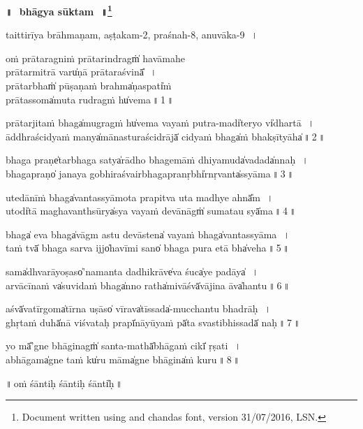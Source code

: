 \documentclass[parskip, DIV=14, pagenumber=head,top, enableddeprecatedfontcommands]{scrartcl}
\renewcommand{\thefootnote}{\fnsymbol{footnote}} %
\begin{document}

\vspace{-1.5cm}

\begin{center}
\textbf{{\Huge॥\,~bhāgya sūktam\,~॥\LARGE\let\thefootnote\relax\footnote{\color{lightgray} Document written using \XeLaTeX{} and chandas font, version 31/07/2016, LSN.}}}
\end{center}
\Large

\centering	

\small{taittirīya brāhmaṇam, aṣṭakam-2, praśnah-8, anuvāka-9\,~।}\\

\large
\vspace{1cm}

oṁ prā॒tara॒gniṁ prā॒tarindragṁ̍ havāmahe\\  prā॒tarmi॒trā varu̍ṇā prā॒tara॒śvinā̎\,~।\\
prā॒tarbhaṁ̍ pū॒ṣaṇa॒ṁ brahma̍ṇa॒spati̍ṁ\\ prā॒tassoma̍mu॒ta ru॒dragṁ hu̍vema\,॥\,1\,॥

prā॒ta॒rjita॒ṁ bhaga̍mu॒gragṁ hu̍vema va॒yaṁ pu॒tra-madi̍te॒ryo vi̍dha॒rtā\,~।\\
ā॒ddhraści॒dyaṁ manya̍mānastu॒raści॒drājā̍ ci॒dyaṁ bhaga̍ṁ bha॒kṣītyāha̍\,॥\,2\,॥

bhaga॒ praṇe̍ta॒rbhaga॒ satya̍rādho॒ bhage॒māṁ dhiya॒muda̍va॒dada̍nnaḥ\,~।\\
bhaga॒praṇo̍ janaya॒ gobhi॒raśvai॒rbhaga॒pranṛbhi̍rnṛ॒vanta̍ssyāma\,॥\,3\,॥

u॒tedānī॒ṁ bhaga̍vantassyāmo॒ta prapi॒tva u॒ta madhye॒ ahnā̎m\,~।\\
u॒todi̍tā maghava॒nthsūrya̍sya va॒yaṁ de॒vānāgṁ̍ suma॒tau syā̍ma\,॥\,4\,॥

bhaga̍ e॒va bhaga̍vāgm astu devā॒stena̍ va॒yaṁ bhaga̍vantassyāma\,~।\\
taṁ tvā̍ bhaga॒ sarva॒ ijjo̍havīmi॒ sano̍ bhaga pura e॒tā bha̍ve॒ha\,॥\,5\,॥

sama̍dhva॒rāyo॒ṣaso̍'namanta dadhi॒krāve̍va॒ śuca̍ye pa॒dāya̍\,~।\\
a॒rvā॒cī॒naṁ va̍su॒vida॒ṁ bhaga̍nno॒ ratha̍mi॒vāśvā̍vā॒jina॒ āva̍hantu\,॥\,6\,॥

aśvā̍vatī॒rgoma̍tīrna u॒ṣāso̍ vī॒rava̍tī॒ssada̍-mucchantu bha॒drāḥ\,~।\\
ghṛ॒taṁ duhā̍nā vi॒śvata॒ḥ prapī̍nāyū॒yaṁ pā̍ta sva॒stibhi॒ssadā̍ naḥ\,॥\,7\,॥

yo mā̎'gne bhā॒ginagṁ̍ sa॒nta-mathā̍bhā॒gaṁ cikī̍ ṛṣati\,~।\\
abhā॒gama̍gne॒ taṁ ku̍ru॒ māma̍gne bhā॒gina̍ṁ kuru\,॥\,8\,॥

॥\,oṁ śānti॒ḥ śānti॒ḥ śānti̍ḥ\,॥
\end{document}
